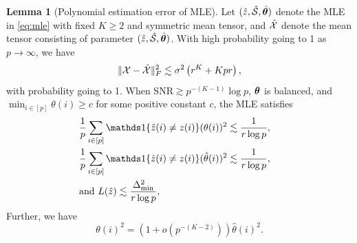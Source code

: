 \documentclass[journal]{IEEEtran}
\theoremstyle{definition}
\newtheorem{lem}{Lemma}
\theoremstyle{definition}
\newcommand{\of}[1]{\left(#1\right)}
\begin{document}
\begin{lem}[Polynomial estimation error of MLE]\label{lem:poly_mle_degree}  Let $(\hat z, \hat {\mathcal{S}}, \hat {\boldsymbol{\theta}})$ denote the MLE in \eqref{eq:mle} {with fixed $K \geq 2$ and symmetric mean tensor}, and $\hat {\mathcal{X}}$ denote the mean tensor consisting of parameter $(\hat z, \hat {\mathcal{S}}, \hat {\boldsymbol{\theta}})$. {With high probability going to 1 as $p \rightarrow \infty$, we} have 
\begin{equation}
    \onormSize{}{\tX - \hat \tX}_F^2 \lesssim \sigma^2 \of{ r^{K} + K p r},
\end{equation}
with probability going to 1. 
When {$\text{SNR} \gtrsim p^{-(K-1)} \log p$,  $\boldsymbol{\theta}$ is balanced, and $\min_{i \in [p]} \theta(i) \geq c$ for some positive constant $c$}, the MLE satisfies
\begin{align}
    &\frac{1}{p} \sum_{i \in [p]} \ind\{ \hat z(i) \neq z(i) \} (\theta(i))^2 \lesssim \frac{1}{r \log p}, \quad\\
    &\frac{1}{p} \sum_{i \in [p]} \ind\{ \hat z(i) \neq z(i) \} (\hat \theta(i))^2 \lesssim \frac{1}{r \log p} ,\quad   \\
    & \text{and } L(\hat z) \lesssim \frac{\Delta_{\min}^2}{r \log p},
\end{align}
Further, we have 
\begin{equation}
     \theta(i)^2 = (1 + o(p^{-(K-2)})) \hat \theta(i)^2.
 \end{equation}
\end{lem}
\end{document}
